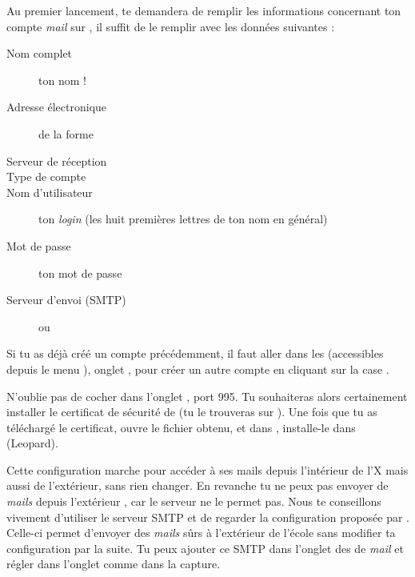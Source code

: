 Au premier lancement,  te demandera de remplir les informations concernant ton compte \emph{mail} sur , il suffit de le remplir avec les données suivantes :
\begin{description}
  \item[Nom complet] ton nom !
  \item[Adresse électronique] de la forme 
  \item[Serveur de réception] 
  \item[Type de compte] 
  \item[Nom d'utilisateur] ton \emph{login}  (les huit premières lettres de ton nom en général)
  \item[Mot de passe] ton mot de passe 
  \item[Serveur d'envoi (SMTP)]  ou 
\end{description}

Si tu as déjà créé un compte précédemment, il faut aller dans les  (accessibles depuis le menu ), onglet , pour créer un autre compte en cliquant sur la case \menu{+}.

N'oublie pas de cocher  dans l'onglet , port 995. Tu souhaiteras alors certainement installer le certificat de sécurité de  (tu le trouveras sur ). Une fois que tu as téléchargé le certificat, ouvre le fichier  obtenu, et dans , installe-le dans %
 (Leopard).

Cette configuration marche pour accéder à ses mails depuis l'intérieur de l'X mais aussi de l'extérieur, sans rien changer. En revanche tu ne peux pas envoyer de \emph{mails} depuis l'extérieur , car le serveur  ne le permet pas. Nous te conseillons vivement d'utiliser le serveur SMTP  et de regarder la configuration proposée par . Celle-ci permet d'envoyer des \emph{mails} sûrs à l'extérieur de l'école sans modifier ta configuration par la suite. Tu peux ajouter ce SMTP dans l'onglet  des  de \emph{mail} et régler dans l'onglet  comme dans la capture.

